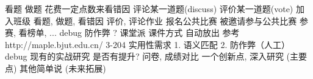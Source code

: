 {}\markdownRendererInterblockSeparator
{}\markdownRendererInterblockSeparator
{}\markdownRendererUlBeginTight
\markdownRendererUlItem 看题\markdownRendererUlItemEnd 
\markdownRendererUlItem 做题\markdownRendererUlItemEnd 
\markdownRendererUlItem 花费一定点数来看错因\markdownRendererUlItemEnd 
\markdownRendererUlItem 评论某一道题(discuss)\markdownRendererUlItemEnd 
\markdownRendererUlItem 评价某一道题(vote)\markdownRendererUlItemEnd 
\markdownRendererUlEndTight \markdownRendererInterblockSeparator
{}\markdownRendererInterblockSeparator
{}\markdownRendererUlBeginTight
\markdownRendererUlItem 加入班级\markdownRendererUlItemEnd 
\markdownRendererUlItem 看题, 做题, 看错因\markdownRendererUlItemEnd 
\markdownRendererUlItem 评价, 评论作业\markdownRendererUlItemEnd 
\markdownRendererUlItem \markdownRendererUlItemEnd 
\markdownRendererUlEndTight \markdownRendererInterblockSeparator
{}\markdownRendererInterblockSeparator
{}\markdownRendererUlBeginTight
\markdownRendererUlItem 报名公共比赛\markdownRendererUlItemEnd 
\markdownRendererUlItem 被邀请参与公共比赛\markdownRendererUlItemEnd 
\markdownRendererUlItem 参赛, 看榜单, ...\markdownRendererUlItemEnd 
\markdownRendererUlEndTight \markdownRendererInterblockSeparator
{}\markdownRendererInterblockSeparator
{}debug 防作弊 ? 课堂派 课件方式 自动放出 参考  http://maple.bjut.edu.cn/ 3-204\markdownRendererInterblockSeparator
{}实用性需求 1. 语义匹配 2. 防作弊（人工）\markdownRendererInterblockSeparator
{}debug\markdownRendererInterblockSeparator
{}现有的实战研究 是否有提升?\markdownRendererInterblockSeparator
{}问卷, 成绩对比\markdownRendererInterblockSeparator
{}一个创新点, 深入研究 (主要点) 其他简单说 (未来拓展)\relax